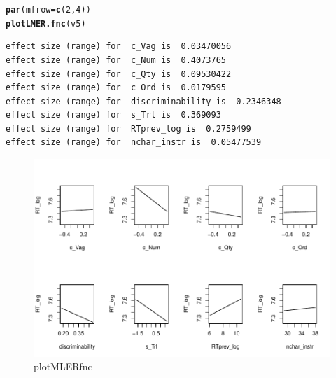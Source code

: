 \documentclass[a4paper,12pt,twoside]{article}\usepackage[]{graphicx}\usepackage[]{color}
\makeatletter
\def\maxwidth{ %
  \ifdim\Gin@nat@width>\linewidth
    \linewidth
  \else
    \Gin@nat@width
  \fi
}
\newcommand{\hlnum}[1]{\textcolor[rgb]{0.686,0.059,0.569}{#1}}%
\newcommand{\hlstd}[1]{\textcolor[rgb]{0.345,0.345,0.345}{#1}}%
\newcommand{\hlkwc}[1]{\textcolor[rgb]{0.333,0.667,0.333}{#1}}%
\newcommand{\hlkwd}[1]{\textcolor[rgb]{0.737,0.353,0.396}{\textbf{#1}}}%
\newenvironment{kframe}{%
 \def\at@end@of@kframe{}%
 \ifinner\ifhmode%
  \def\at@end@of@kframe{\end{minipage}}%
  \begin{minipage}{\columnwidth}%
 \fi\fi%
 \def\FrameCommand##1{\hskip\@totalleftmargin \hskip-\fboxsep
 \colorbox{shadecolor}{##1}\hskip-\fboxsep
     \hskip-\linewidth \hskip-\@totalleftmargin \hskip\columnwidth}%
 \MakeFramed {\advance\hsize-\width
   \@totalleftmargin\z@ \linewidth\hsize
   \@setminipage}}%
 {\par\unskip\endMakeFramed%
 \at@end@of@kframe}
\newenvironment{knitrout}{}{} %
\makeatother
\begin{document}
\begin{knitrout}\scriptsize
{}\color{fgcolor}\begin{kframe}
\begin{alltt}
\hlkwd{par}\hlstd{(}\hlkwc{mfrow} \hlstd{=} \hlkwd{c}\hlstd{(}\hlnum{2}\hlstd{,} \hlnum{4}\hlstd{))}
\hlkwd{plotLMER.fnc}\hlstd{(v5)}
\end{alltt}
\begin{verbatim}
effect size (range) for  c_Vag is  0.03470056 
effect size (range) for  c_Num is  0.4073765 
effect size (range) for  c_Qty is  0.09530422 
effect size (range) for  c_Ord is  0.0179595 
effect size (range) for  discriminability is  0.2346348 
effect size (range) for  s_Trl is  0.369093 
effect size (range) for  RTprev_log is  0.2759499 
effect size (range) for  nchar_instr is  0.05477539 
\end{verbatim}
\end{kframe}\begin{figure}[hbtp]

{\centering \includegraphics[width=\maxwidth]{figure/graphics-plotLMERfnc-1} 

}

\caption[plotMLERfnc]{plotMLERfnc}\label{fig:plotLMERfnc}
\end{figure}


\end{knitrout}

\clearpage
\end{document}
